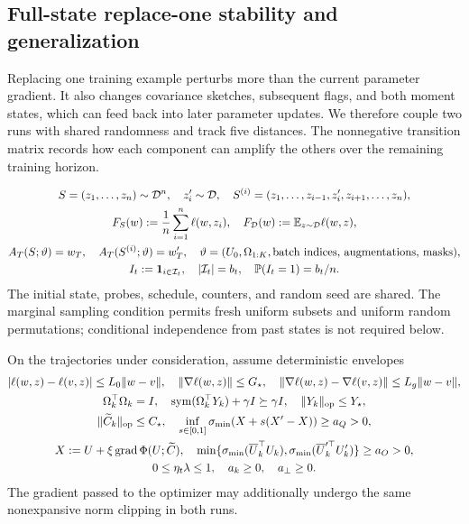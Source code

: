 \subsection{Full-state replace-one stability and generalization}
Replacing one training example perturbs more than the current parameter
gradient. It also changes covariance sketches, subsequent flags, and both
moment states, which can feed back into later parameter updates. We therefore
couple two runs with shared randomness and track five distances. The
nonnegative transition matrix records how each component can amplify the
others over the remaining training horizon.

\begin{definition}
\begin{gather}
 S=(z_1,\ldots,z_n)\sim\mathcal D^n,\quad z_i'\sim\mathcal D,\quad
 S^{(i)}=(z_1,\ldots,z_{i-1},z_i',z_{i+1},\ldots,z_n),\\
 F_S(w):=\frac1n\sum_{i=1}^n\ell(w,z_i),\quad
 F_\mathcal D(w):=\mathbb E_{z\sim\mathcal D}\ell(w,z),\\
 A_T(S;\vartheta)=w_T,\quad A_T(S^{(i)};\vartheta)=w_T',\quad
 \vartheta=(U_0,\Omega_{1:K},\text{batch indices, augmentations, masks}),\\
 I_t:=\mathbf1_{i\in\mathcal I_t},\quad |\mathcal I_t|=b_t,\quad
 \mathbb P(I_t=1)=b_t/n.
\end{gather}
The initial state, probes, schedule, counters, and random seed are shared.
The marginal sampling condition permits fresh uniform subsets and uniform random
permutations; conditional independence from past states is not required below.
\end{definition}
\begin{assumption}\label{ass:rigid-stability}
On the trajectories under consideration, assume deterministic envelopes
\begin{gather}
 |\ell(w,z)-\ell(v,z)|\le L_0\|w-v\|,\quad
 \|\nabla\ell(w,z)\|\le G_\star,\quad
 \|\nabla\ell(w,z)-\nabla\ell(v,z)\|\le L_g\|w-v\|,\\
 \Omega_k^\top\Omega_k=I,\quad
 \operatorname{sym}(\Omega_k^\top Y_k)+\gamma I\succeq\gamma I,\quad\|Y_k\|_{\mathrm{op}}\le Y_\star,\\
 \|\widetilde C_k\|_{\mathrm{op}}\le C_\star,\quad
 \inf_{s\in[0,1]}\sigma_{\min}(X+s(X'-X))\ge a_Q>0,\\
 X:=U+\xi\operatorname{grad}\Phi(U;\widetilde C),\quad
 \min\{\sigma_{\min}(\overline U_k^\top U_k),
       \sigma_{\min}(\overline U_k'^\top U_k')\}\ge a_O>0,\\
 0\le\eta_t\lambda\le1,\quad a_k\ge0,\quad a_\perp\ge0.
\end{gather}
The gradient passed to the optimizer may additionally undergo the same
nonexpansive norm clipping in both runs.
\end{assumption}
